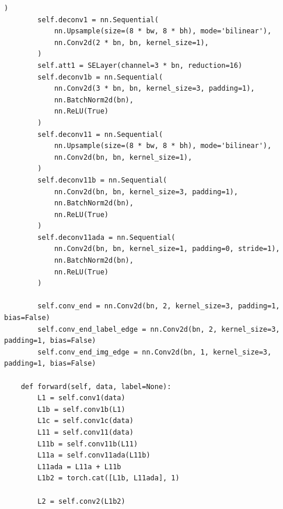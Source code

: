 \begin{lstlisting}[caption= Продолжение листинга A.1]
        )
        self.deconv1 = nn.Sequential(
            nn.Upsample(size=(8 * bw, 8 * bh), mode='bilinear'),
            nn.Conv2d(2 * bn, bn, kernel_size=1),
        )
        self.att1 = SELayer(channel=3 * bn, reduction=16)
        self.deconv1b = nn.Sequential(
            nn.Conv2d(3 * bn, bn, kernel_size=3, padding=1),
            nn.BatchNorm2d(bn),
            nn.ReLU(True)
        )
        self.deconv11 = nn.Sequential(
            nn.Upsample(size=(8 * bw, 8 * bh), mode='bilinear'),
            nn.Conv2d(bn, bn, kernel_size=1),
        )
        self.deconv11b = nn.Sequential(
            nn.Conv2d(bn, bn, kernel_size=3, padding=1),
            nn.BatchNorm2d(bn),
            nn.ReLU(True)
        )
        self.deconv11ada = nn.Sequential(
            nn.Conv2d(bn, bn, kernel_size=1, padding=0, stride=1),
            nn.BatchNorm2d(bn),
            nn.ReLU(True)
        )
        
        self.conv_end = nn.Conv2d(bn, 2, kernel_size=3, padding=1, bias=False)
        self.conv_end_label_edge = nn.Conv2d(bn, 2, kernel_size=3, padding=1, bias=False)
        self.conv_end_img_edge = nn.Conv2d(bn, 1, kernel_size=3, padding=1, bias=False)

    def forward(self, data, label=None):
        L1 = self.conv1(data)
        L1b = self.conv1b(L1)
        L1c = self.conv1c(data)
        L11 = self.conv11(data)
        L11b = self.conv11b(L11)
        L11a = self.conv11ada(L11b)
        L11ada = L11a + L11b
        L1b2 = torch.cat([L1b, L11ada], 1)

        L2 = self.conv2(L1b2)
\end{lstlisting}

